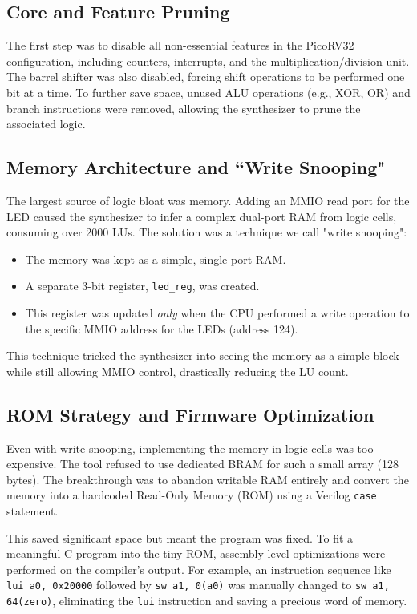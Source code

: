 \documentclass[conference]{IEEEtran}
\begin{document}
\subsection{Core and Feature Pruning}
The first step was to disable all non-essential features in the PicoRV32 configuration, including counters, interrupts, and the multiplication/division unit. The barrel shifter was also disabled, forcing shift operations to be performed one bit at a time. To further save space, unused ALU operations (e.g., XOR, OR) and branch instructions were removed, allowing the synthesizer to prune the associated logic.

\subsection{Memory Architecture and ``Write Snooping"}
The largest source of logic bloat was memory. Adding an MMIO read port for the LED caused the synthesizer to infer a complex dual-port RAM from logic cells, consuming over 2000 LUs. The solution was a technique we call "write snooping":
\begin{itemize}
    \item The memory was kept as a simple, single-port RAM.
    \item A separate 3-bit register, \verb|led_reg|, was created.
    \item This register was updated \textit{only} when the CPU performed a write operation to the specific MMIO address for the LEDs (address 124).
\end{itemize}
This technique tricked the synthesizer into seeing the memory as a simple block while still allowing MMIO control, drastically reducing the LU count.

\subsection{ROM Strategy and Firmware Optimization}
Even with write snooping, implementing the memory in logic cells was too expensive. The tool refused to use dedicated BRAM for such a small array (128 bytes). The breakthrough was to abandon writable RAM entirely and convert the memory into a hardcoded Read-Only Memory (ROM) using a Verilog \verb|case| statement.

This saved significant space but meant the program was fixed. To fit a meaningful C program into the tiny ROM, assembly-level optimizations were performed on the compiler's output. For example, an instruction sequence like \verb|lui a0, 0x20000| followed by \verb|sw a1, 0(a0)| was manually changed to \verb|sw a1, 64(zero)|, eliminating the \verb|lui| instruction and saving a precious word of memory.
\end{document}
